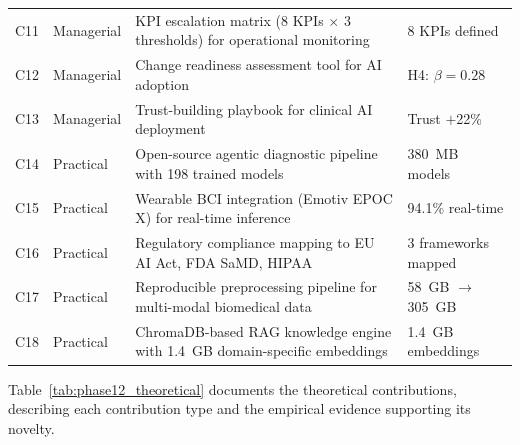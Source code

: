 \begin{xltabular}{\textwidth}{@{} l l X l @{}}
\addlinespace
C11 & Managerial & KPI escalation matrix (8 KPIs $\times$ 3 thresholds) for operational monitoring                    & 8 KPIs defined \\
\addlinespace
C12 & Managerial & Change readiness assessment tool for AI adoption                                                   & H4: $\beta = 0.28$ \\
\addlinespace
C13 & Managerial & Trust-building playbook for clinical AI deployment                                                 & Trust $+$22\% \\
\addlinespace
C14 & Practical  & Open-source agentic diagnostic pipeline with 198 trained models                                    & 380~MB models \\
\addlinespace
C15 & Practical  & Wearable BCI integration (Emotiv EPOC X) for real-time inference                                   & 94.1\% real-time \\
\addlinespace
C16 & Practical  & Regulatory compliance mapping to EU AI Act, FDA SaMD, HIPAA                                        & 3 frameworks mapped \\
\addlinespace
C17 & Practical  & Reproducible preprocessing pipeline for multi-modal biomedical data                                & 58~GB $\rightarrow$ 305~GB \\
\addlinespace
C18 & Practical  & ChromaDB-based RAG knowledge engine with 1.4~GB domain-specific embeddings                         & 1.4~GB embeddings \\
\end{xltabular}
\endgroup

\vspace{1.5em}

Table~\ref{tab:phase12_theoretical} documents the theoretical contributions, describing each contribution type and the empirical evidence supporting its novelty.

